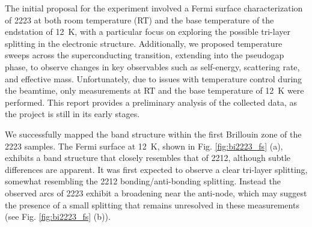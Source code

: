 The initial proposal for the experiment involved a Fermi surface characterization of 2223 at both room temperature (RT) and the base temperature of the endstation of \qty{12}{\kelvin}, with a particular focus on exploring the possible tri-layer splitting in the electronic structure.
Additionally, we proposed temperature sweeps across the superconducting transition, extending into the pseudogap phase, to observe changes in key observables such as self-energy, scattering rate, and effective mass.
Unfortunately, due to issues with temperature control during the beamtime, only measurements at RT and the base temperature of \qty{12}{\kelvin} were performed.
This report provides a preliminary analysis of the collected data, as the project is still in its early stages.

We successfully mapped the band structure within the first Brillouin zone of the 2223 samples.
The Fermi surface at \qty{12}{\kelvin}, shown in Fig. \ref{fig:bi2223_fs} (a), exhibits a band structure that closely resembles that of 2212, although subtle differences are apparent.
It was first expected to observe a clear tri-layer splitting, somewhat resembling the 2212 bonding/anti-bonding splitting.
Instead the observed arcs of 2223 exhibit a broadening near the anti-node, which may suggest the presence of a small splitting that remains unresolved in these measurements (see Fig. \ref{fig:bi2223_fs} (b)).

